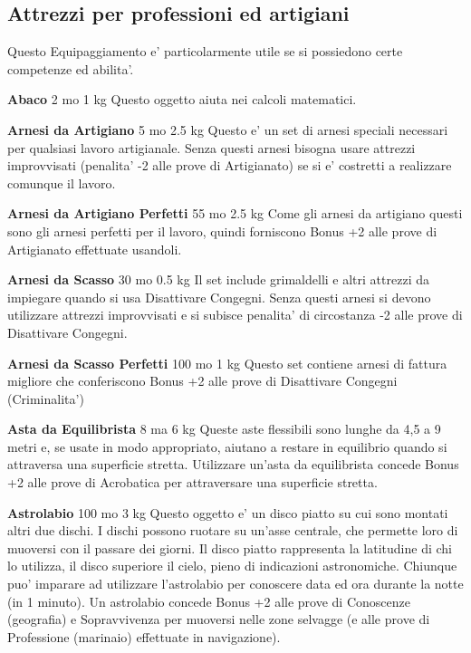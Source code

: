 \documentclass[a4paper,11pt,twoside,openany]{book}
\begin{document}
{\pagebreak

\subsection{Attrezzi per professioni ed artigiani}

\label{attrezzi-per-professioni-ed-artigiani}

Questo Equipaggiamento e' particolarmente utile se si possiedono certe competenze ed abilita'.

\textbf{Abaco} 2 mo 1 kg Questo oggetto aiuta nei calcoli matematici.

\textbf{Arnesi da Artigiano} 5 mo 2.5 kg Questo e' un set di arnesi speciali necessari per qualsiasi lavoro artigianale. Senza questi arnesi bisogna usare attrezzi improvvisati (penalita' -2 alle prove di Artigianato) se si e' costretti a realizzare comunque il lavoro.

\textbf{Arnesi da Artigiano Perfetti} 55 mo 2.5 kg Come gli arnesi da artigiano questi sono gli arnesi perfetti per il lavoro, quindi forniscono Bonus +2 alle prove di Artigianato effettuate usandoli.

\textbf{Arnesi da Scasso} 30 mo 0.5 kg Il set include grimaldelli e altri attrezzi da impiegare quando si usa Disattivare Congegni. Senza questi arnesi si devono utilizzare attrezzi improvvisati e si subisce penalita' di circostanza -2 alle prove di Disattivare Congegni.

\textbf{Arnesi da Scasso Perfetti} 100 mo 1 kg Questo set contiene arnesi di fattura migliore che conferiscono Bonus +2 alle prove di Disattivare Congegni (Criminalita')

\textbf{Asta da Equilibrista} 8 ma 6 kg Queste aste flessibili sono lunghe da 4,5 a 9 metri e, se usate in modo appropriato, aiutano a restare in equilibrio quando si attraversa una superficie stretta. Utilizzare un'asta da equilibrista concede Bonus +2 alle prove di Acrobatica per attraversare una superficie stretta.

\textbf{Astrolabio} 100 mo 3 kg Questo oggetto e' un disco piatto su cui sono montati altri due dischi. I dischi possono ruotare su un'asse centrale, che permette loro di muoversi con il passare dei giorni. Il disco piatto rappresenta la latitudine di chi lo utilizza, il disco superiore il cielo, pieno di indicazioni astronomiche. Chiunque puo' imparare ad utilizzare l'astrolabio per conoscere data ed ora durante la notte (in 1 minuto). Un astrolabio concede Bonus +2 alle prove di Conoscenze (geografia) e Sopravvivenza per muoversi nelle zone selvagge (e alle prove di Professione (marinaio) effettuate in navigazione).

}
\end{document}
